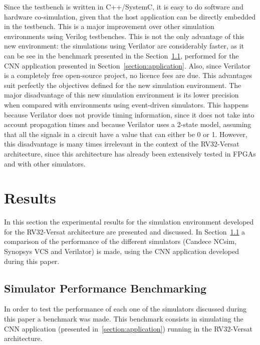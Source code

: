 \documentclass[conference]{IEEEtran}
\begin{document}
Since the testbench is written in C++/SystemC, it is easy to do software and
hardware co-simulation, given that the host application can be directly embedded
in the testbench. This is a major improvement over other simulation environments
using Verilog testbenches. This is not the only advantage of this new
environment: the simulations using Verilator are considerably faster, as it can
be see in the benchmark presented in the Section~\ref{section:benchmark},
performed for the \ac{CNN} application presented in
Section~\ref{section:application}. Also, since Verilator is a completely free
open-source project, no licence fees are due. This advantages suit perfectly the 
objectives defined for the new simulation environment.
The major disadvantage of this new simulation environment is its lower
precision when compared with environments using event-driven simulators. This
happens because Verilator does not provide timing information, since it does not
take into account propagation times and because Verilator uses a 2-state model,
assuming that all the signals in a circuit have a value that can either be 0 or
1.  However, this disadvantage is many times irrelevant in the context of the
RV32-Versat architecture, since this architecture has already been extensively
tested in \ac{FPGA}s and with other simulators.


\section{Results}
\label{chapter:results}

In this section the experimental results for the simulation environment developed for 
the RV32-Versat architecture are presented and discussed. In 
Section~\ref{section:benchmark} a comparison of the performance of the different 
simulators (Candece NCsim, Synopsys VCS and Verilator) is made, using the \ac{CNN} 
application developed during this paper.

\subsection{Simulator Performance Benchmarking}
\label{section:benchmark}

In order to test the performance of each one of the simulators discussed during this 
paper a benchmark was made. This benchmark consists in simulating the \ac{CNN} 
application (presented in~\ref{section:application}) running in the RV32-Versat 
architecture.
\end{document}
